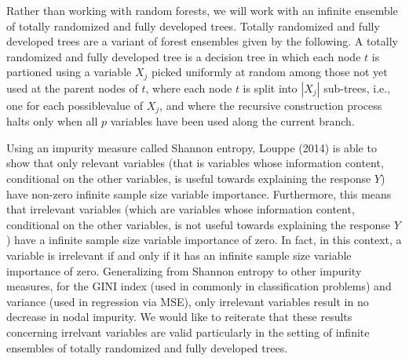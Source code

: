 \documentclass[12pt,twoside]{reedthesis}
\theoremstyle{definition}
\theoremstyle{definition}
\theoremstyle{definition}
\theoremstyle{remark}
\begin{document}
Rather than working with random forests, we will work with an infinite
ensemble of totally randomized and fully developed trees. Totally
randomized and fully developed trees are a variant of forest ensembles
given by the following. A totally randomized and fully developed tree is
a decision tree in which each node \(t\) is partioned using a variable
\(X_j\) picked uniformly at random among those not yet used at the
parent nodes of \(t\), where each node \(t\) is split into \(|X_j|\)
sub-trees, i.e., one for each possiblevalue of \(X_j\), and where the
recursive construction process halts only when all \(p\) variables have
been used along the current branch. \par

Using an impurity measure called Shannon entropy, Louppe (2014) is able
to show that only relevant variables (that is variables whose
information content, conditional on the other variables, is useful
towards explaining the response \(Y\)) have non-zero infinite sample
size variable importance. Furthermore, this means that irrelevant
variables (which are variables whose information content, conditional on
the other variables, is not useful towards explaining the response
\(Y\)) have a infinite sample size variable importance of zero. In fact,
in this context, a variable is irrelevant if and only if it has an
infinite sample size variable importance of zero. Generalizing from
Shannon entropy to other impurity measures, for the GINI index (used in
commonly in classification problems) and variance (used in regression
via MSE), only irrelevant variables result in no decrease in nodal
impurity. We would like to reiterate that these results concerning
irrelvant variables are valid particularly in the setting of infinite
ensembles of totally randomized and fully developed trees. \par
\end{document}
